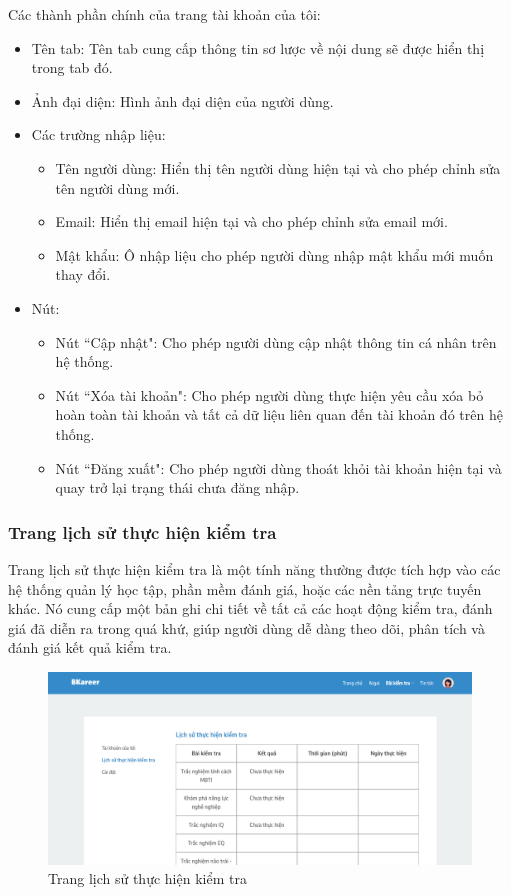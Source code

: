 Các thành phần chính của trang tài khoản của tôi:
\begin{itemize}
    \item Tên tab: Tên tab cung cấp thông tin sơ lược về nội dung sẽ được hiển thị trong tab đó.
    \item Ảnh đại diện: Hình ảnh đại diện của người dùng.
    \item Các trường nhập liệu:
        \begin{itemize}
            \item Tên người dùng: Hiển thị tên người dùng hiện tại và cho phép chỉnh sửa tên người dùng mới.
            \item Email: Hiển thị email hiện tại và cho phép chỉnh sửa email mới.
            \item Mật khẩu: Ô nhập liệu cho phép người dùng nhập mật khẩu mới muốn thay đổi.
        \end{itemize}
    \item Nút:
        \begin{itemize}
            \item Nút ``Cập nhật": Cho phép người dùng cập nhật thông tin cá nhân trên hệ thống.
            \item Nút ``Xóa tài khoản": Cho phép người dùng thực hiện yêu cầu xóa bỏ hoàn toàn tài khoản và tất cả dữ liệu liên quan đến tài khoản đó trên hệ thống.
            \item Nút ``Đăng xuất": Cho phép người dùng thoát khỏi tài khoản hiện tại và quay trở lại trạng thái chưa đăng nhập.
        \end{itemize}
\end{itemize}

\subsubsection{Trang lịch sử thực hiện kiểm tra}
Trang lịch sử thực hiện kiểm tra là một tính năng thường được tích hợp vào các hệ thống quản lý học tập, phần mềm đánh giá, hoặc các nền tảng trực tuyến khác. Nó cung cấp một bản ghi chi tiết về tất cả các hoạt động kiểm tra, đánh giá đã diễn ra trong quá khứ, giúp người dùng dễ dàng theo dõi, phân tích và đánh giá kết quả kiểm tra.

\begin{figure}[H]
    \centering
    \includegraphics[width=0.8\linewidth]{images/chap5/profile-Result.png}
    \vspace{0.5cm}
    \caption{Trang lịch sử thực hiện kiểm tra}
\end{figure}

